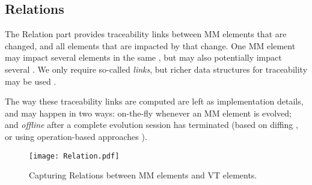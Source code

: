 \subsection{Relations}
\label{sec:Suggestion:Relation}

The \textsf{Relation} part provides traceability links between \textsf{MM}
elements that are \textsf{changed}, and all \viewtype elements that are 
\textsf{impacted} by that change. One \textsf{MM} element
may impact several elements in the same \viewtype, but may also potentially
impact several \viewtypes. We only require so-called \emph{links}, but richer
data structures for traceability may be used \autocite{Batot-Cabot-Gerard:2021}.

The way these traceability links are computed are left as implementation
details, and may happen in two ways: \textsf{on-the-fly} whenever an \textsf{MM} element is evolved; and \emph{offline}
after a complete evolution session has terminated (based on diffing \autocite{Kehrer-Kelter-Taentzer:2011}, or using 
operation-based approaches \parencite{J:Lippe-Oosterom:1992}).

\begin{figure}[t]
    \centering
    \texttt{[image: Relation.pdf]}
    \caption{Capturing \textsf{Relation}s between \textsf{MM} elements and \textsf{VT} elements.}
    \label{fig:Relation}
\end{figure}

